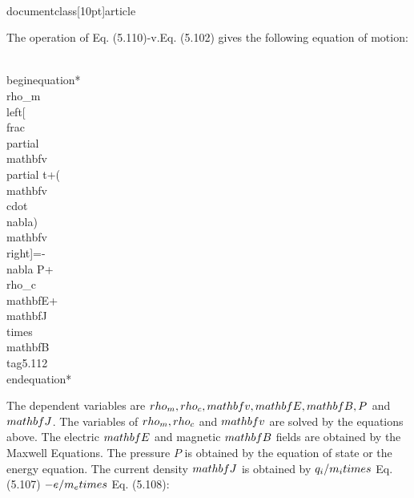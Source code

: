 \\documentclass[10pt]{article}
\begin{document}
{{{{The operation of Eq. (5.110)-v.Eq. (5.102) gives the following equation of motion:


\\begin{equation*}
\\rho_{m}\\left[\\frac{\\partial \\mathbf{v}}{\\partial t}+(\\mathbf{v} \\cdot \\nabla) \\mathbf{v}\\right]=-\\nabla P+\\rho_{c} \\mathbf{E}+\\mathbf{J} \\times \\mathbf{B} \\tag{5.112}
\\end{equation*}


The dependent variables are $\\rho_{m}, \\rho_{c}, \\mathbf{v}, \\mathbf{E}, \\mathbf{B}, P$ and $\\mathbf{J}$. The variables of $\\rho_{m}, \\rho_{c}$ and $\\mathbf{v}$ are solved by the equations above. The electric $\\mathbf{E}$ and magnetic $\\mathbf{B}$ fields are obtained by the Maxwell Equations. The pressure $P$ is obtained by the equation of state or the energy equation. The current density $\\mathbf{J}$ is obtained by $q_{i} / m_{i} \\times$ Eq. (5.107) $-e / m_{e} \\times$ Eq. (5.108):


}}}}
\end{document}
